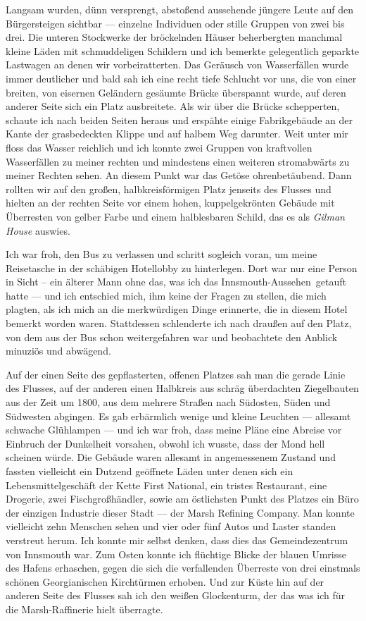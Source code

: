 Langsam wurden, dünn versprengt, abstoßend aussehende jüngere Leute auf den Bürgersteigen sichtbar --- einzelne Individuen oder stille Gruppen von zwei bis drei. Die unteren Stockwerke der bröckelnden Häuser beherbergten manchmal kleine Läden mit schmuddeligen Schildern und ich bemerkte gelegentlich geparkte Lastwagen an denen wir vorbeiratterten. Das Geräusch von Wasserfällen wurde immer deutlicher und bald sah ich eine recht tiefe Schlucht vor uns, die von einer breiten, von eisernen Geländern gesäumte Brücke überspannt wurde, auf deren anderer Seite sich ein Platz ausbreitete. Als wir über die Brücke schepperten, schaute ich nach beiden Seiten heraus und erspähte einige Fabrikgebäude an der Kante der grasbedeckten Klippe und auf halbem Weg darunter. Weit unter mir floss das Wasser reichlich und ich konnte zwei Gruppen von kraftvollen Wasserfällen zu meiner rechten und mindestens einen weiteren stromabwärts zu meiner Rechten sehen. An diesem Punkt war das Getöse ohrenbetäubend. Dann rollten wir auf den großen, halbkreisförmigen Platz jenseits des Flusses und hielten an der rechten Seite vor einem hohen, kuppelgekrönten Gebäude mit Überresten von gelber Farbe und einem halblesbaren Schild, das es als \textit{Gilman House} auswies.

Ich war froh, den Bus zu verlassen und schritt sogleich voran, um meine Reisetasche in der schäbigen Hotellobby zu hinterlegen. Dort war nur eine Person in Sicht -- ein älterer Mann ohne das, was ich das \glqq Innsmouth-Aussehen\grqq\ getauft hatte --- und ich entschied mich, ihm keine der Fragen zu stellen, die mich plagten, als ich mich an die merkwürdigen Dinge erinnerte, die in diesem Hotel bemerkt worden waren. Stattdessen schlenderte ich nach draußen auf den Platz, von dem aus der Bus schon weitergefahren war und beobachtete den Anblick minuziös und abwägend.

Auf der einen Seite des gepflasterten, offenen Platzes sah man die gerade Linie des Flusses, auf der anderen einen Halbkreis aus schräg überdachten Ziegelbauten aus der Zeit um 1800, aus dem mehrere Straßen nach Südosten, Süden und Südwesten abgingen. Es gab erbärmlich wenige und kleine Leuchten --- allesamt schwache Glühlampen --- und ich war froh, dass meine Pläne eine Abreise vor Einbruch der Dunkelheit vorsahen, obwohl ich wusste, dass der Mond hell scheinen würde. Die Gebäude waren allesamt in angemessenem Zustand und fassten vielleicht ein Dutzend geöffnete Läden unter denen sich ein Lebensmittelgeschäft der Kette First National, ein tristes Restaurant, eine Drogerie, zwei Fischgroßhändler, sowie am östlichsten Punkt des Platzes ein Büro der einzigen Industrie dieser Stadt --- der Marsh Refining Company. Man konnte vielleicht zehn Menschen sehen und vier oder fünf Autos und Laster standen verstreut herum. Ich konnte mir selbst denken, dass dies das Gemeindezentrum von Innsmouth war. Zum Osten konnte ich flüchtige Blicke der blauen Umrisse des Hafens erhaschen, gegen die sich die verfallenden Überreste von drei einstmals schönen Georgianischen Kirchtürmen erhoben. Und zur Küste hin auf der anderen Seite des Flusses sah ich den weißen Glockenturm, der das was ich für die Marsh-Raffinerie hielt überragte.

